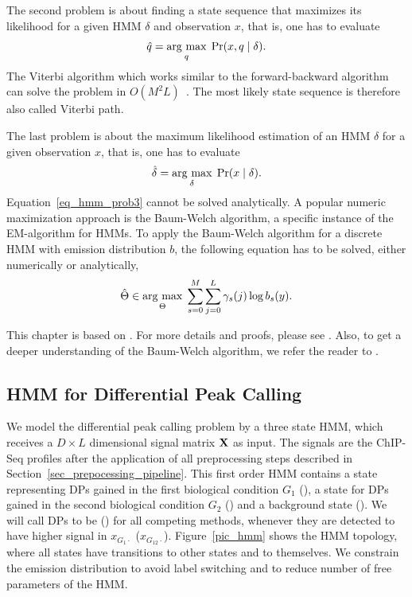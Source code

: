 \noindent
The second problem is about finding a state sequence that maximizes its likelihood for a given HMM $\delta$ and observation $x$, that is, one has to evaluate
\begin{align*}
 \hat{q} = \underset{q}{\operatorname{arg}\,\operatorname{max}}\; \Pr(x, q \mid \delta).
\end{align*}
The Viterbi algorithm which works similar to the forward-backward algorithm can solve the problem in $O(M^2L)$~\citep{rabiner1989}.
The most likely state sequence is therefore also called Viterbi path.

\noindent
The last problem is about the maximum likelihood estimation of an HMM $\delta$ for a given observation $x$, that is, one has to evaluate
\begin{align}
 \hat{\delta} = \argmax{\delta} \Pr(x \mid \delta). \label{eq_hmm_prob3}
\end{align}
Equation~\ref{eq_hmm_prob3} cannot be solved analytically.
A popular numeric maximization approach is the Baum-Welch algorithm, a specific instance of the EM-algorithm for HMMs.
To apply the Baum-Welch algorithm for a discrete HMM with emission distribution $b$, the following equation has to be solved, either numerically or analytically,
\begin{align}
 \hat{\Theta} \in \argmax{\Theta} \sum_{s=0}^M \sum_{j=0}^{L} \gamma_s(j) \log b_s(y). \label{eq_em_emission}
\end{align}

\noindent
This chapter is based on \cite{Couvreur1996}.
For more details and proofs, please see \cite{rabiner1989}.
Also, to get a deeper understanding of the Baum-Welch algorithm, we refer the reader to \cite{bilmes1997}.


\subsection{HMM for Differential Peak Calling}
\label{hmm_for_dpc}
We model the differential peak calling problem by a three state HMM, which receives a $D \times L$ dimensional signal matrix $\mathbf{X}$ as input. 
The signals are the ChIP-Seq profiles after the application of all preprocessing steps described in Section~\ref{sec_prepocessing_pipeline}. 
This first order HMM contains a state representing DPs gained in the first biological condition $G_1$ (), a state for DPs gained in the second biological condition $G_2$ () and a background state ().
We will call DPs to be  () for all competing methods, whenever they are detected to have higher signal in $x_{G_1\cdot}$ ($x_{G_12\cdot}$).
Figure~\ref{pic_hmm} shows the HMM topology, where all states have transitions to other states and to themselves.
We constrain the emission distribution to avoid label switching and to reduce number of free parameters of the HMM.

